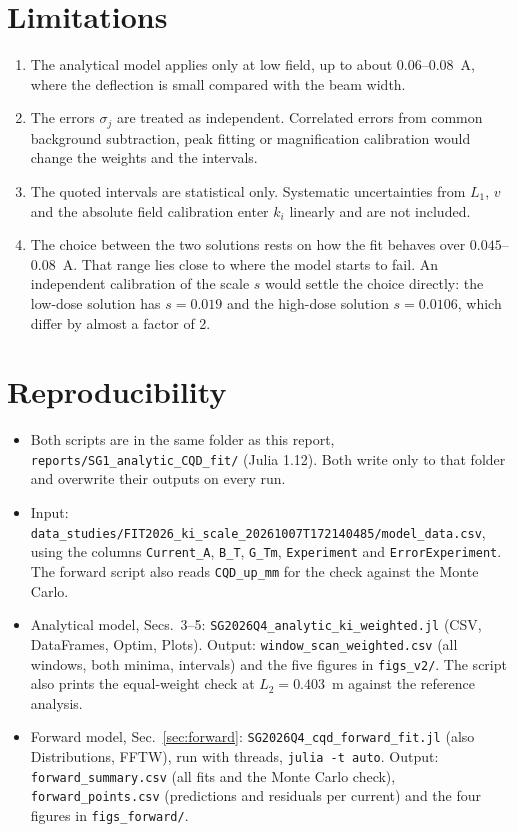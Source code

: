 \documentclass[11pt,a4paper]{article}
\newcommand{\kan}{k_i}
\begin{document}
\section{Limitations}
\begin{enumerate}
\item The analytical model applies only at low field, up to about 0.06--0.08~A, where the deflection is small compared with the beam width.
\item The errors $\sigma_j$ are treated as independent. Correlated errors from common background subtraction, peak fitting or magnification calibration would change the weights and the intervals.
\item The quoted intervals are statistical only. Systematic uncertainties from $L_1$, $v$ and the absolute field calibration enter $\kan$ linearly and are not included.
\item The choice between the two solutions rests on how the fit behaves over $0.045$--$0.08$~A. That range lies close to where the model starts to fail. An independent calibration of the scale $s$ would settle the choice directly: the low-dose solution has $s = 0.019$ and the high-dose solution $s = 0.0106$, which differ by almost a factor of 2.
\end{enumerate}

\section{Reproducibility}
{\sloppy
\begin{itemize}
\item Both scripts are in the same folder as this report, \texttt{reports/\allowbreak SG1\_analytic\_CQD\_fit/} (Julia 1.12). Both write only to that folder and overwrite their outputs on every run.
\item Input: \texttt{data\_studies/\allowbreak FIT2026\_ki\_scale\_20261007T172140485/\allowbreak model\_data.csv}, using the columns \texttt{Current\_A}, \texttt{B\_T}, \texttt{G\_Tm}, \texttt{Experiment} and \texttt{ErrorExperiment}. The forward script also reads \texttt{CQD\_up\_mm} for the check against the Monte Carlo.
\item Analytical model, Secs.~3--5: \texttt{SG2026Q4\_analytic\_ki\_weighted.jl} (CSV, DataFrames, Optim, Plots). Output: \texttt{window\_scan\_weighted.csv} (all windows, both minima, intervals) and the five figures in \texttt{figs\_v2/}. The script also prints the equal-weight check at $L_2 = 0.403$~m against the reference analysis.
\item Forward model, Sec.~\ref{sec:forward}: \texttt{SG2026Q4\_cqd\_forward\_fit.jl} (also Distributions, FFTW), run with threads, \texttt{julia -t auto}. Output: \texttt{forward\_summary.csv} (all fits and the Monte Carlo check), \texttt{forward\_points.csv} (predictions and residuals per current) and the four figures in \texttt{figs\_forward/}.
\end{itemize}
\par}
\end{document}
